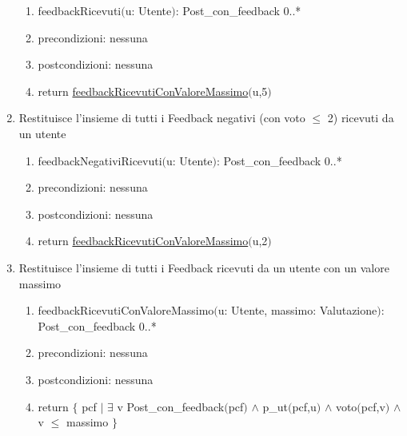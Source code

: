 \documentclass{article}
\begin{document}
\begin{enumerate}
\begin{enumerate}
        \item feedbackRicevuti$($u: Utente$)$: Post\_con\_feedback 0..*
        \item precondizioni: nessuna
        \item postcondizioni: nessuna
        \item return \hyperref[sec:feedbackRicevutiConValoreMassimo]{feedbackRicevutiConValoreMassimo}$($u,5$)$
    \end{enumerate}
    \newpage
    \item\label{sec:feedbackNegativiRicevuti} Restituisce l'insieme di tutti i Feedback negativi (con voto $\leq$ 2) ricevuti da un utente
    \begin{enumerate}
        \item feedbackNegativiRicevuti$($u: Utente$)$: Post\_con\_feedback 0..*
        \item precondizioni: nessuna
        \item postcondizioni: nessuna
        \item return \hyperref[sec:feedbackRicevutiConValoreMassimo]{feedbackRicevutiConValoreMassimo}$($u,2$)$
    \end{enumerate}
    \newpage
    \item\label{sec:feedbackRicevutiConValoreMassimo} Restituisce l'insieme di tutti i Feedback ricevuti da un utente con un valore massimo
    \begin{enumerate}
        \item feedbackRicevutiConValoreMassimo$($u: Utente, massimo: Valutazione$)$: Post\_con\_feedback 0..*
        \item precondizioni: nessuna
        \item postcondizioni: nessuna
        \item return $\{$ pcf $|$ $\exists$ v Post\_con\_feedback$($pcf$)$ $\land$ p\_ut$($pcf,u$)$ $\land$ voto$($pcf,v$)$ $\land$ v $\leq$ massimo $\}$
    \end{enumerate}
\end{enumerate}
\end{document}
